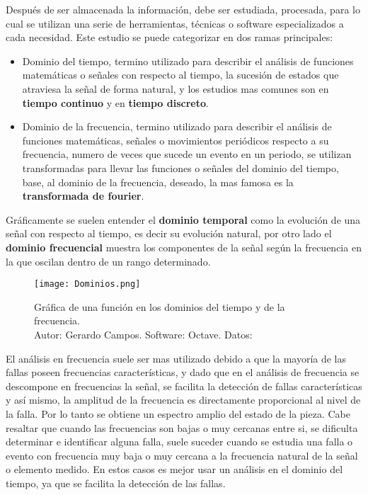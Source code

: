 Después de ser almacenada la información, debe ser estudiada, procesada, para lo
cual se utilizan una serie de herramientas, técnicas o software especializados
a cada necesidad. Este estudio se puede categorizar en dos ramas principales:

\begin{itemize}
    \item Dominio del tiempo, termino utilizado para describir el análisis
        de funciones matemáticas o señales con respecto al tiempo, la sucesión
        de estados que atraviesa la señal de forma natural, y los estudios mas
        comunes son en  \textbf{tiempo continuo} y en \textbf{tiempo discreto}.

    \item Dominio de la frecuencia, termino utilizado para describir el análisis
        de funciones matemáticas, señales o movimientos periódicos respecto a
        su frecuencia, numero de veces que sucede un evento en un periodo, se
        utilizan transformadas para llevar las funciones o señales del dominio
        del tiempo, base, al dominio de la frecuencia, deseado, la mas famosa es
        la \textbf{transformada de fourier}.
\end{itemize}


Gráficamente se suelen entender el \textbf{dominio temporal} como la evolución
de una señal con respecto al tiempo, es decir su evolución natural, por otro
lado el \textbf{dominio frecuencial} muestra los componentes de la señal según
la frecuencia en la que oscilan dentro de un rango determinado.

	\begin{figure}[htb]
		\centering
		\caption{Gráfica de una función en los dominios del tiempo y de la
                frecuencia.\\ Autor: Gerardo Campos. \hspace{0.5cm}
                Software: Octave. \hspace{0.5cm}
                Datos: \Cite{HUANG20181745}
        }
		\label{Dominios }
        \texttt{[image: Dominios.png]}
	\end{figure}


El análisis en frecuencia suele ser mas utilizado debido a que
la mayoría de las fallas poseen frecuencias características, y dado que en  el
análisis de frecuencia se descompone en frecuencias la señal, se facilita la
detección de fallas características y así mismo, la amplitud de la frecuencia es
directamente proporcional al nivel de la falla. Por lo tanto se obtiene un
espectro amplio del estado de la pieza.
Cabe resaltar que cuando las frecuencias son bajas o muy cercanas entre si,
se dificulta determinar e identificar alguna falla, suele suceder cuando se
estudia una falla o evento con frecuencia muy baja o muy cercana a la frecuencia
natural de la señal o elemento medido. En estos casos es mejor
usar un análisis en el dominio del tiempo, ya que se facilita la
detección de las fallas.



